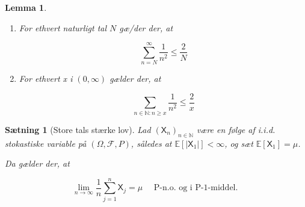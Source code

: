 \documentclass{article}
\newcommand{\1}{\mathbbm{1}}
\newtheorem{lemma}[theorem]{Lemma}
\newtheorem{proposition}[theorem]{Sætning}
\theoremstyle{boxed}
\begin{document}
\begin{theorem-box}
    \begin{lemma}
        \begin{enumerate}
            \item[\textnormal{(i)}] For ethvert naturligt tal $N$ gæ/der der, at

            $$
            \sum_{n=N}^{\infty} \frac{1}{n^2} \leq \frac{2}{N}
            $$
            
            \item[\textnormal{(ii)}] For ethvert x i $(0, \infty)$ gælder der, at
            
            $$
            \sum_{n \in \mathbb{N}: n \geq x} \frac{1}{n^2} \leq \frac{2}{x}
            $$
            
        \end{enumerate}
    \end{lemma}
\end{theorem-box}
\begin{theorem-box}
    \begin{proposition}[Store tals stærke lov]
        Lad $\left(\mathsf{X}_n\right)_{n \in \mathbb{N}}$ være en følge af i.i.d. stokastiske variable på $(\Omega, \mathcal{F}, P)$, således at $\mathbb{E}\left[\left|\mathsf{X}_1\right|\right]<\infty$, og sæt $\mathbb{E}\left[\mathsf{X}_1\right]=\mu$.

Da gælder der, at

$$
\lim _{n \rightarrow \infty} \frac{1}{n} \sum_{j=1}^n \mathsf{X}_j=\mu \quad \text { P-n.o. og i P-1-middel. }
$$

    \end{proposition}
\end{theorem-box}
\end{document}

